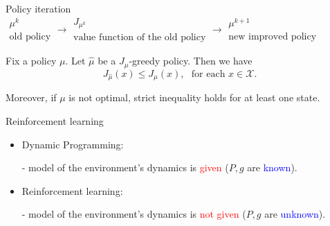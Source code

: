 \documentclass{beamer}
\def\X{{\mathcal X}}
\newcommand{\blue}[1]{\textcolor{blue}{#1}}
\newcommand{\red}[1]{\textcolor{red}{#1}}
\begin{document}
\begin{frame}{Policy iteration}
$
 \begin{array}{c}
    \mu^k \\ \text{old policy}
  \end{array}\longrightarrow \begin{array}{c}
    J_{\mu^k} \\ \text{value function of the old policy}
  \end{array}\longrightarrow \begin{array}{c}
    \mu^{k+1}  \\ \text{new improved policy }
  \end{array}
  $

  \begin{theorem}
Fix a policy $\mu$. Let $\hat \mu$ be a $J_\mu$-greedy policy.
  Then we have $$J_{\hat \mu}(x)\leq J_\mu(x),~~~\text{for each }x\in \X.$$

  Moreover, if $\mu$ is not optimal, strict inequality holds for at least one state.
  \end{theorem}
\end{frame}

\begin{frame}{Reinforcement learning}
\begin{itemize}
\item Dynamic Programming:

- model of the environment's dynamics is \red{given} ($P,g$ are \blue{known}).

\item Reinforcement learning:

- model of the environment's dynamics is \red{not given} ($P,g$ are \blue{unknown}).

    \end{itemize}
\end{frame}
\end{document}
